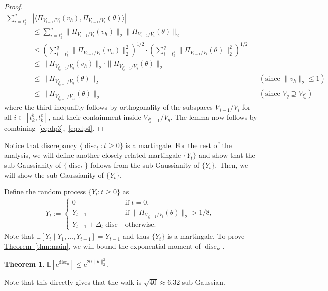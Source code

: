 \documentclass[11pt]{article}
\numberwithin{equation}{section}
\newtheorem{theorem}{Theorem}[section]
\theoremstyle{definition}
\theoremstyle{plain}
\newcommand{\eee}{\mathrm e}
\newcommand{\expref}[2]{\hyperref[#2]{#1~\ref{#2}}}
\newcommand\E{\mathbb{E}}
\DeclareMathOperator{\disc}{disc}   %
\newcommand{\ip}[2]{\langle #1, #2 \rangle}
\begin{document}
\begin{proof}
\begin{align}
\sum_{i=t^b_k}^{q} &\left|\ip{\Pi_{V_{i-1}/V_i}(v_h)}{\Pi_{V_{i-1}/V_i}(\theta)}\right|
  &\\
  &\leq \sum_{i=t^b_k}^{q}
\|\Pi_{V_{i-1}/V_i}(v_h)\|_2 \|\Pi_{V_{i-1}/V_i}(\theta)\|_2 \nonumber \\
&\leq \left(\sum_{i=t^b_k}^{q}
\|\Pi_{V_{i-1}/V_i}(v_h)\|_2^2\right)^{1/2} \cdot \left(\sum_{i=t^b_k}^{q} \|\Pi_{V_{i-1}/V_i}(\theta)\|_2^2\right)^{1/2}\nonumber \\
&\leq \|\Pi_{V_{t^b_k-1}/V_{q}}(v_h)\|_2 \cdot \|\Pi_{V_{t^b_k-1}/V_{q}}(\theta)\|_2\nonumber \\
&\leq  \|\Pi_{V_{t^b_k-1}/V_{q}}(\theta)\|_2 && \left(\text{since } \|v_h\|_2 \leq 1\right) \nonumber \\
&\leq  \|\Pi_{V_{t^b_k-1}/V_{t^e_k}}(\theta)\|_2 && \left(\text{since } V_q\supseteq V_{t^e_k}\right) \label{eq:dp4}
\end{align}
where the third inequality follows by orthogonality of the subspaces
$V_{i-1}/V_i$ for all $i \in [t^b_k,t^e_k]$, and their containment inside
$V_{t^b_k-1}/V_{q}$. The lemma now follows by combining~\eqref{eq:dp3},~\eqref{eq:dp4}.
\end{proof}

Notice that discrepancy $\{\disc_t: t \ge 0\}$ is a martingale. For the rest of the
analysis, we will define another closely related martingale $\{Y_t\}$ and show
that the sub-Gaussianity of $\{\disc_t\}$ follows from the sub-Gaussianity of $\{Y_t\}$. 
Then, we will show the sub-Gaussianity of $\{Y_t\}$.

Define the random process $\{Y_t:  t\ge 0\}$ as
\begin{align*}
Y_t :=
	\begin{cases}
		0  & \mbox{if } t=0, \\
		Y_{t-1} & \mbox{if } \| \Pi_{V_{f_t-1}/V_{t}} (\theta) \|_2 > 1/8, \\
		Y_{t-1}+ \Delta_t \disc & \text{otherwise.}
	\end{cases}
\end{align*}
Note that $\E[Y_t\mid Y_1,\ldots,Y_{t-1}] = Y_{t-1}$ and thus $\{Y_t\}$ is a martingale.
To prove \expref{Theorem}{thm:main}, we will bound the exponential moment of $\disc_n$.

\begin{theorem}
\label{thm:moment-bound}
$ \E[\eee^{\disc_n}] \le \eee^{20 \|\theta\|_2^2}. $
\end{theorem}
Note that this directly gives that the walk is $\sqrt{40} \approx 6.32$-sub-Gaussian.
\end{document}
